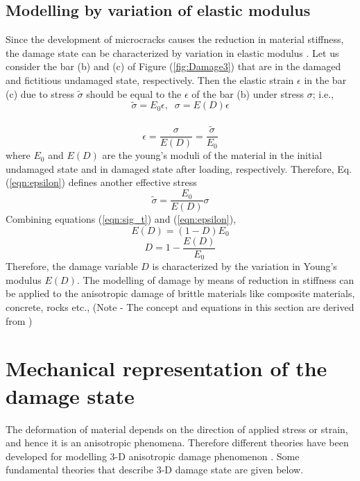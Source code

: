 \documentclass[12pt,a4paper,twoside,openright]{report}
\begin{document}
\subsection{Modelling by variation of elastic modulus} 
\indent\indent\indent Since the development of microcracks causes the reduction in material stiffness, the damage state can be characterized by variation in elastic modulus \citep{lemaitre1978aspect}. Let us consider the bar (b) and (c) of Figure (\ref{fig:Damage3}) that are in the damaged and fictitious undamaged state, respectively. Then the elastic strain $\epsilon$ in the bar (c) due to stress $\tilde{\sigma}$ should be equal to the $\epsilon$ of the bar (b) under stress $\sigma$; i.e.,\\
\begin{equation}
\label{eqn:sig_t2}
   \tilde{\sigma} = E_{0}\epsilon, \;\;  \sigma = E(D)\epsilon 
\end{equation}
\\
\begin{equation}
\label{eqn:epsilon}
\epsilon = \frac{\sigma}{E(D)} = \frac{\tilde{\sigma}}{E_{0}}
\end{equation}
where $E_{0}$ and $E(D)$ are the young's moduli of the material in the initial undamaged state and in damaged state after loading, respectively. Therefore, Eq. (\ref{eqn:epsilon}) defines another effective stress\\
\begin{equation}
\label{eqn:epsilon2}
  \tilde{\sigma} = \frac{E_{0}}{E(D)}\sigma
\end{equation}
Combining equations (\ref{eqn:sig_t}) and (\ref{eqn:epsilon}),
\begin{equation}
\label{eqn:E(d)}
E(D) = (1 - D) E_{0}
\end{equation}
\begin{equation}
\label{eqn:D2}
D  = 1 - \frac{E(D)}{E_{0}}
\end{equation}
Therefore, the damage variable $D$ is characterized by the variation in Young's modulus $E(D)$. The modelling of damage by means of reduction in stiffness can be applied to the anisotropic damage of brittle materials like composite materials, concrete, rocks etc., (Note - The concept and equations in this section are derived from \citep{murakami2012continuum})


\section{Mechanical representation of the damage state}
\indent\indent\indent The deformation of material depends on the direction of applied stress or strain, and hence it is an anisotropic phenomena. Therefore different theories have been developed for modelling 3-D anisotropic damage phenomenon \citep{murakami2012continuum}. Some fundamental theories that describe 3-D damage state are given below. 
\end{document}

